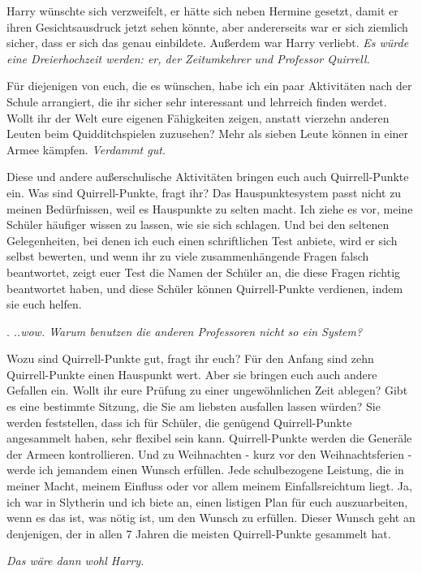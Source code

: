 Harry wünschte sich verzweifelt, er hätte sich neben Hermine gesetzt, damit er
ihren Gesichtsausdruck jetzt sehen könnte, aber andererseits war er sich
ziemlich sicher, dass er sich das genau einbildete. Außerdem war Harry verliebt.
\emph{Es würde eine Dreierhochzeit werden: er, der Zeitumkehrer und Professor
Quirrell.}

\glqq{}Für diejenigen von euch, die es wünschen, habe ich ein paar Aktivitäten
nach der Schule arrangiert, die ihr sicher sehr interessant und lehrreich finden
werdet. Wollt ihr der Welt eure eigenen Fähigkeiten zeigen, anstatt vierzehn
anderen Leuten beim Quidditchspielen zuzusehen? Mehr als sieben Leute können in
einer Armee kämpfen.\grqq{} \emph{Verdammt gut.}

\glqq{}Diese und andere außerschulische Aktivitäten bringen euch auch
Quirrell-Punkte ein. Was sind Quirrell-Punkte, fragt ihr? Das Hauspunktesystem
passt nicht zu meinen Bedürfnissen, weil es Hauspunkte zu selten macht. Ich
ziehe es vor, meine Schüler häufiger wissen zu lassen, wie sie sich schlagen.
Und bei den seltenen Gelegenheiten, bei denen ich euch einen schriftlichen Test
anbiete, wird er sich selbst bewerten, und wenn ihr zu viele zusammenhängende
Fragen falsch beantwortet, zeigt euer Test die Namen der Schüler an, die diese
Fragen richtig beantwortet haben, und diese Schüler können Quirrell-Punkte
verdienen, indem sie euch helfen.\grqq{}

. \emph{..wow. Warum benutzen die anderen Professoren nicht so ein System?}

\glqq{}Wozu sind Quirrell-Punkte gut, fragt ihr euch? Für den Anfang sind zehn
Quirrell-Punkte einen Hauspunkt wert. Aber sie bringen euch auch andere Gefallen
ein. Wollt ihr eure Prüfung zu einer ungewöhnlichen Zeit ablegen? Gibt es eine
bestimmte Sitzung, die Sie am liebsten ausfallen lassen würden? Sie werden
feststellen, dass ich für Schüler, die genügend Quirrell-Punkte angesammelt
haben, sehr flexibel sein kann. Quirrell-Punkte werden die Generäle der Armeen
kontrollieren. Und zu Weihnachten - kurz vor den Weihnachtsferien - werde ich
jemandem einen Wunsch erfüllen. Jede schulbezogene Leistung, die in meiner
Macht, meinem Einfluss oder vor allem meinem Einfallsreichtum liegt. Ja, ich war
in Slytherin und ich biete an, einen listigen Plan für euch auszuarbeiten, wenn
es das ist, was nötig ist, um den Wunsch zu erfüllen. Dieser Wunsch geht an
denjenigen, der in allen 7 Jahren die meisten Quirrell-Punkte gesammelt
hat.\grqq{}

\emph{Das wäre dann wohl Harry.}

